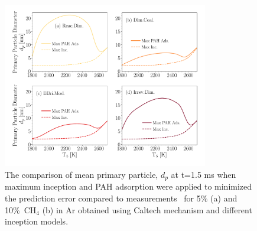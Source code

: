 \begin{figure}[H]
	\centering
	\includegraphics[width=0.8\textwidth]{Figures/Results/Shocktube/Agafonov2016_cvr/d_p_maxincads.pdf}
	\caption{The comparison of mean primary particle, $d_p$ at t=1.5 ms when maximum inception and PAH adsorption were applied to minimized the prediction  error compared to measurements~\citep{agafonov2016unified} for 5\% (a) and 10\%~$\mathrm{CH_4}$ (b) in Ar obtained using Caltech mechanism and different inception models.}
	\label{fig:shockagof_dp_maxincads_cvr} 
\end{figure}